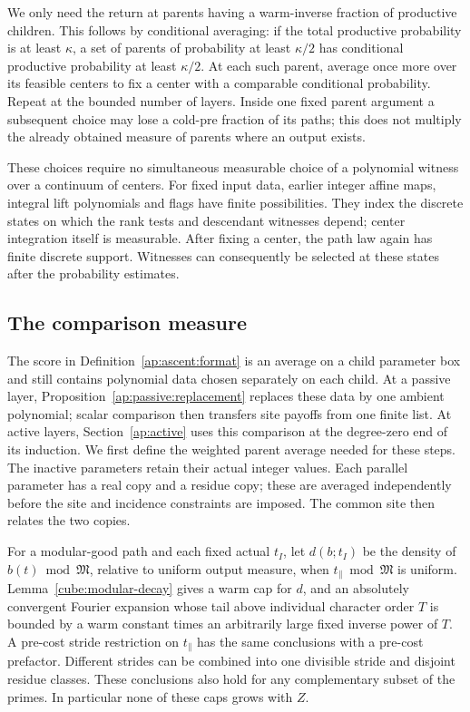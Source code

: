 We only need the return at parents having a warm-inverse fraction
of productive children.  This follows by conditional averaging:
if the total productive probability is at least $\kappa$, a set of
parents of probability at least $\kappa/2$ has conditional productive
probability at least $\kappa/2$.  At each such parent, average once
more over its feasible centers to fix a center with a comparable
conditional probability.  Repeat at the bounded number of layers.
Inside one fixed parent argument a subsequent choice may lose a
cold-pre fraction of its paths; this does not multiply the already
obtained measure of parents where an output exists.

These choices require no simultaneous measurable choice of a
polynomial witness over a continuum of centers.  For fixed input
data, earlier integer affine maps, integral lift polynomials and
flags have finite possibilities.  They index the discrete states
on which the rank tests and descendant witnesses depend; center
integration itself is measurable.  After fixing a center, the path
law again has finite discrete support.  Witnesses can consequently
be selected at these states after the probability estimates.

\subsection{The comparison measure}

The score in Definition~\ref{ap:ascent:format} is an average on a
child parameter box and still contains polynomial data chosen
separately on each child. At a passive layer,
Proposition~\ref{ap:passive:replacement} replaces these data by one
ambient polynomial; scalar comparison then transfers site payoffs
from one finite list. At active layers, Section~\ref{ap:active}
uses this comparison at the degree-zero end of its induction.
We first define the weighted parent average needed for these steps.
The inactive
parameters retain their actual integer values.  Each parallel
parameter has a real copy and a residue copy; these are averaged
independently before the site and incidence constraints are imposed.
The common site then relates the two copies.

For a modular-good path and each fixed actual $t_I$, let
$d(b;t_I)$ be the density of $b(t)\bmod\mathfrak M$, relative to uniform
output measure, when $t_\parallel\bmod\mathfrak M$ is uniform.
Lemma~\ref{cube:modular-decay} gives a warm cap for $d$, and an
absolutely convergent Fourier expansion whose tail above individual
character order $T$ is bounded by a warm constant times an arbitrarily
large fixed inverse power of $T$. A pre-cost stride restriction on
$t_\parallel$ has the same conclusions with a pre-cost prefactor.
Different strides can be combined into one divisible stride and
disjoint residue classes. These conclusions also hold for any
complementary subset of the primes. In particular none of these caps
grows with $Z$.

